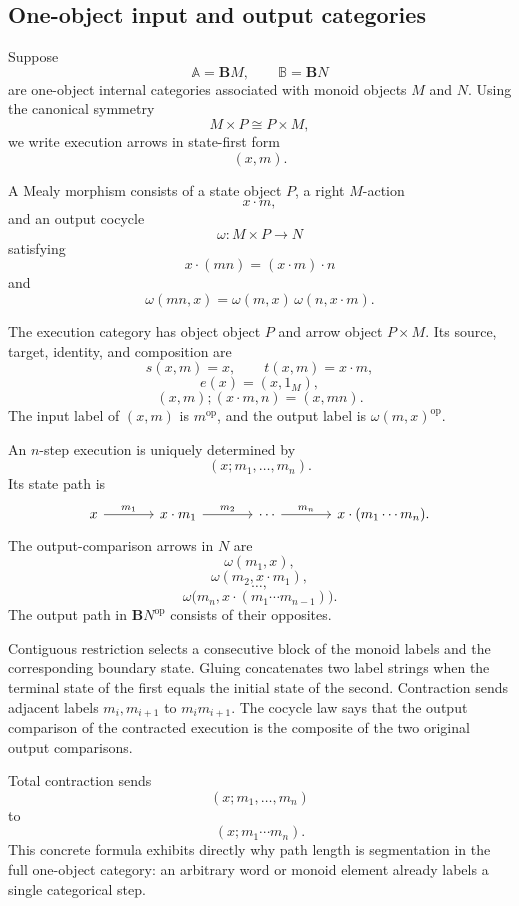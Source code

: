 \subsection{One-object input and output categories}
\label{subsec:temporal-one-object-specialization}

Suppose
\[
    \mathbb A=\mathbf B M,
    \qquad
    \mathbb B=\mathbf B N
\]
are one-object internal categories associated with monoid objects \(M\) and
\(N\). Using the canonical symmetry
\[
    M\times P\cong P\times M,
\]
we write execution arrows in state-first form
\[
    (x,m).
\]

A Mealy morphism consists of a state object \(P\), a right \(M\)-action
\[
    x\cdot m,
\]
and an output cocycle
\[
    \omega:M\times P\to N
\]
satisfying
\[
    x\cdot(mn)
    =
    (x\cdot m)\cdot n
\]
and
\[
    \omega(mn,x)
    =
    \omega(m,x)\,
    \omega(n,x\cdot m).
\]

The execution category has object object \(P\) and arrow object
\(P\times M\). Its source, target, identity, and composition are
\[
    s(x,m)=x,
    \qquad
    t(x,m)=x\cdot m,
\]
\[
    e(x)=(x,1_M),
\]
\[
    (x,m);(x\cdot m,n)
    =
    (x,mn).
\]
The input label of \((x,m)\) is \(m^{\mathrm{op}}\), and the output label is
\(\omega(m,x)^{\mathrm{op}}\).

An \(n\)-step execution is uniquely determined by
\[
    (x;m_1,\ldots,m_n).
\]
Its state path is
\[
\begin{tikzcd}[column sep=large]
    x
        \arrow[r, "m_1"]
    &
    x\cdot m_1
        \arrow[r, "m_2"]
    &
    \cdots
        \arrow[r, "m_n"]
    &
    x\cdot(m_1\cdots m_n).
\end{tikzcd}
\]
The output-comparison arrows in \(N\) are
\[
    \omega(m_1,x),
\]
\[
    \omega(m_2,x\cdot m_1),
\]
\[
    \ldots,
\]
\[
    \omega
    \bigl(
        m_n,
        x\cdot(m_1\cdots m_{n-1})
    \bigr).
\]
The output path in \(\mathbf BN^{\mathrm{op}}\) consists of their opposites.

Contiguous restriction selects a consecutive block of the monoid labels and
the corresponding boundary state. Gluing concatenates two label strings when
the terminal state of the first equals the initial state of the second.
Contraction sends adjacent labels \(m_i,m_{i+1}\) to \(m_im_{i+1}\). The
cocycle law says that the output comparison of the contracted execution is the
composite of the two original output comparisons.

Total contraction sends
\[
    (x;m_1,\ldots,m_n)
\]
to
\[
    (x;m_1\cdots m_n).
\]
This concrete formula exhibits directly why path length is segmentation in the
full one-object category: an arbitrary word or monoid element already labels a
single categorical step.

